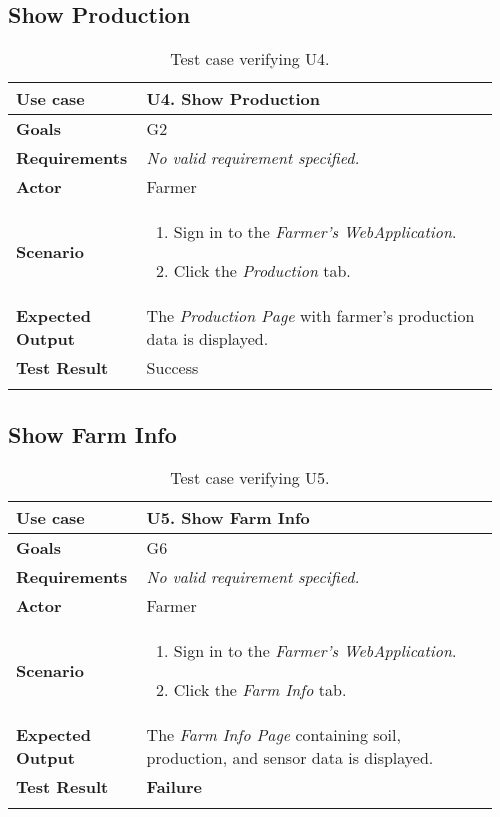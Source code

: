 \subsection{Show Production}

\begin{longtable}{@{}p{0.25\linewidth}p{0.71\linewidth}@{}}
	\toprule
	\textbf{Use case} & \textbf{U4.} Show Production\\
	\midrule
	\textbf{Goals} & G2\\
	\midrule
	\textbf{Requirements} & \textit{No valid requirement specified.}\\
	\midrule
	\textbf{Actor} & Farmer\\
	\midrule
	\textbf{Scenario} &
	\begin{enumerate}[leftmargin=.4cm,noitemsep,topsep=0pt,before=\vspace{-3mm},after=\vspace{-4mm}]
		\item Sign in to the \textit{Farmer's WebApplication}.
		\item Click the \textit{Production} tab.
	\end{enumerate}\\
	\midrule
	\textbf{Expected Output} & The \textit{Production Page} with farmer's production data is displayed.\\
	\midrule
	\textbf{Test Result} & Success\\
	\bottomrule
	\caption{Test case verifying U4.}
\end{longtable}

\subsection{Show Farm Info}

\begin{longtable}{@{}p{0.25\linewidth}p{0.71\linewidth}@{}}
	\toprule
	\textbf{Use case} & \textbf{U5.} Show Farm Info\\
	\midrule
	\textbf{Goals} & G6\\
	\midrule
	\textbf{Requirements} & \textit{No valid requirement specified.}\\
	\midrule
	\textbf{Actor} & Farmer\\
	\midrule
	\textbf{Scenario} &
	\begin{enumerate}[leftmargin=.4cm,noitemsep,topsep=0pt,before=\vspace{-3mm},after=\vspace{-4mm}]
		\item Sign in to the \textit{Farmer's WebApplication}.
		\item Click the \textit{Farm Info} tab.
	\end{enumerate}\\
	\midrule
	\textbf{Expected Output} & The \textit{Farm Info Page} containing soil, production, and sensor data is displayed.\\
	\midrule
	\textbf{Test Result} & \textbf{Failure}\\
	\bottomrule
	\caption{Test case verifying U5.}
\end{longtable}

